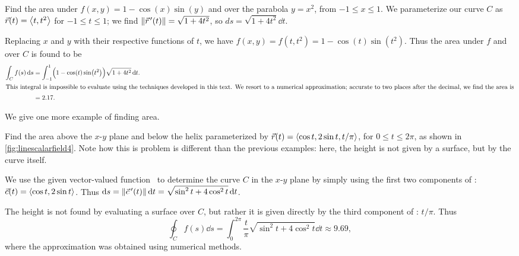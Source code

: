 \begin{example}\label{ex_linescalarfield5}%
Find the area under $f(x,y) = 1-\cos(x)\sin(y)$ and over the parabola $y = x^2$, from $-1\leq x\leq 1$.
\solution
We parameterize our curve $C$ as $\vec r(t) =\left\langle t,t^2\right\rangle$ for $-1\leq t\leq 1$; we find $\left\lVert \vec r\hskip1.25pt '(t) \right\rVert = \sqrt{1+4t^2}$, so $ds = \sqrt{1+4t^2}\dd t$. 

Replacing $x$ and $y$ with their respective functions of $t$, we have $f(x,y) = f(t,t^2) = 1-\cos(t)\sin(t^2)$. Thus the area under $f$ and over $C$ is found to be
\begin{align*}
	\int_C f(s)\operatorname{d}\! s
	&= \int_{-1}^1 \Bigl(1-\cos(t)\sin\bigl(t^2\bigr)\Bigr)\sqrt{1+4t^2}\operatorname{d}\! t.\\
\intertext{This integral is impossible to evaluate using the techniques developed in this text. We resort to a numerical approximation; accurate to two places after the decimal, we find the area is}
	&= 2.17.
\end{align*}
\end{example}

We give one more example of finding area.

\begin{example}\label{ex_linescalarfield4}%
Find
%
%
the area above the $x$-$y$ plane and below the helix parameterized by $\vec r(t) =\left\langle \cos t,2\sin t,t/\pi\right\rangle$, for $0\leq t\leq 2\pi$, as shown in \autoref{fig:linescalarfield4}.
\solution
Note how this is problem is different than the previous examples: here, the height is not given by a surface, but by the curve itself. 

We use the given vector-valued function \vrt\ to determine the curve $C$ in the $x$-$y$ plane by simply using the first two components of \vrt: $\vec c(t) =\left\langle \cos t,2\sin t\right\rangle$. Thus $\operatorname{d}\! s = \left\lVert \vec c\,'(t) \right\rVert\operatorname{d}\! t = \sqrt{\sin^2t + 4\cos^2t}\operatorname{d}\! t$. 

The height is not found by evaluating a surface over $C$, but rather it is given directly by the third component of \vrt: $t/\pi$. Thus
\[
\oint_C f(s)\dd s
= \int_0^{2\pi} \frac{t}{\pi}\sqrt{\sin^2t + 4\cos^2t}\dd t \approx 9.69,
\]
where the approximation was obtained using numerical methods.
\end{example}

